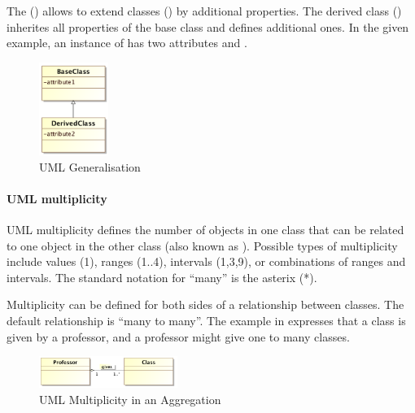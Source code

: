 The  () allows to extend classes () by additional properties. The derived class () inherites all properties of the base class and defines additional ones. In the given example, an instance of  has two attributes  and .
%
\begin{figure}[h]
\centering
\includegraphics[width=0.2\textwidth]{images/uml/umlGeneralisation.png}
\caption{UML Generalisation}
\label{fig:umlGeneralisation}
\end{figure}
%
\paragraph{UML multiplicity}
UML multiplicity defines the number of objects in one class that can be related to one object in the other class (also known as ). Possible types of multiplicity include values (1), ranges (1$..$4), intervals (1,3,9), or combinations of ranges and intervals. The standard notation for ``many'' is the asterix (*). 

Multiplicity can be defined for both sides of a relationship between classes. The default relationship is ``many to many''. 
The example in  expresses that a class is given by a professor, and a professor might give one to many classes.
\begin{figure}[h]
\centering
\includegraphics[width=0.4\textwidth]{images/uml/umlMultiplicity.png}
\caption{UML Multiplicity in an Aggregation}
\label{fig:umlMulti}
\end{figure}


